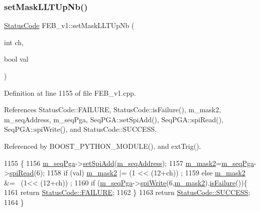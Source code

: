 \subsubsection{\texorpdfstring{set\+Mask\+L\+L\+T\+Up\+Nb()}{setMaskLLTUpNb()}}
{\footnotesize\ttfamily \hyperlink{classStatusCode}{Status\+Code} F\+E\+B\+\_\+v1\+::set\+Mask\+L\+L\+T\+Up\+Nb (\begin{DoxyParamCaption}\item[{int}]{ch,  }\item[{bool}]{val }\end{DoxyParamCaption})}



Definition at line 1155 of file F\+E\+B\+\_\+v1.\+cpp.



References Status\+Code\+::\+F\+A\+I\+L\+U\+RE, Status\+Code\+::is\+Failure(), m\+\_\+mask2, m\+\_\+seq\+Address, m\+\_\+seq\+Pga, Seq\+P\+G\+A\+::set\+Spi\+Add(), Seq\+P\+G\+A\+::spi\+Read(), Seq\+P\+G\+A\+::spi\+Write(), and Status\+Code\+::\+S\+U\+C\+C\+E\+SS.



Referenced by B\+O\+O\+S\+T\+\_\+\+P\+Y\+T\+H\+O\+N\+\_\+\+M\+O\+D\+U\+L\+E(), and ext\+Trig().


\begin{DoxyCode}
1155                                                  \{
1156   \hyperlink{classFEB__v1_a6c7804ac86796f233a8393043adf2e77}{m\_seqPga}->\hyperlink{classSeqPGA_ac998ce3a6d9b5f2e88cc8393f8c1df53}{setSpiAdd}(\hyperlink{classFEB__v1_a1c1eb093fd1733b9510fcf8bc5c7ad08}{m\_seqAddress});
1157   \hyperlink{classFEB__v1_a25f03f6de00618dd575fc1f77a9af9ee}{m\_mask2}=\hyperlink{classFEB__v1_a6c7804ac86796f233a8393043adf2e77}{m\_seqPga}->\hyperlink{classSeqPGA_ab3d0e5e5d4014bc7a92588a76b8713d4}{spiRead}(6);
1158   \textcolor{keywordflow}{if} (val)  \hyperlink{classFEB__v1_a25f03f6de00618dd575fc1f77a9af9ee}{m\_mask2} |= (1 << (12+ch))  ;
1159   \textcolor{keywordflow}{else}      \hyperlink{classFEB__v1_a25f03f6de00618dd575fc1f77a9af9ee}{m\_mask2} &= ~(1<< (12+ch)) ;
1160   \textcolor{keywordflow}{if} (\hyperlink{classFEB__v1_a6c7804ac86796f233a8393043adf2e77}{m\_seqPga}->\hyperlink{classSeqPGA_ad4421841ce4ce8b88ad13f63216f0743}{spiWrite}(6,\hyperlink{classFEB__v1_a25f03f6de00618dd575fc1f77a9af9ee}{m\_mask2}).\hyperlink{classStatusCode_a5dd22dc6eb2c52fc4cabc58f6dea2eb7}{isFailure}())\{
1161     \textcolor{keywordflow}{return} \hyperlink{classStatusCode_a6f565cbeadc76d14c72f047e5e85eb4ba3da73d4c469762eb9d3c960368252b26}{StatusCode::FAILURE};
1162   \}
1163   \textcolor{keywordflow}{return} \hyperlink{classStatusCode_a6f565cbeadc76d14c72f047e5e85eb4badd0da38d3ba0d922efd1f4619bc37ad8}{StatusCode::SUCCESS};  
1164 \}
\end{DoxyCode}
\mbox{\label{classObject_ae30fea75683c2d149b6b6d17c09ecd0c}} 

